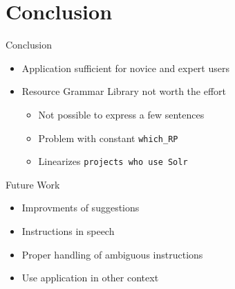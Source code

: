 \section{Conclusion} 
\begin{frame}{Conclusion}\pause
\begin{itemize}
\item Application sufficient for novice and expert users \pause
\item Resource Grammar Library not worth the effort\pause
  \begin{itemize}
    \item Not possible to express a few sentences\pause
    \item Problem with constant \texttt{which\_RP}\pause
    \item Linearizes \texttt{projects \textcolor{String}{who} use Solr}\pause  
  \end{itemize}
\end{itemize}
\end{frame}

\begin{frame}{Future Work}\pause
\begin{itemize}
\item Improvments of suggestions \pause
\item Instructions in speech \pause
\item Proper handling of ambiguous instructions
\item Use application in other context
\end{itemize}
\end{frame}